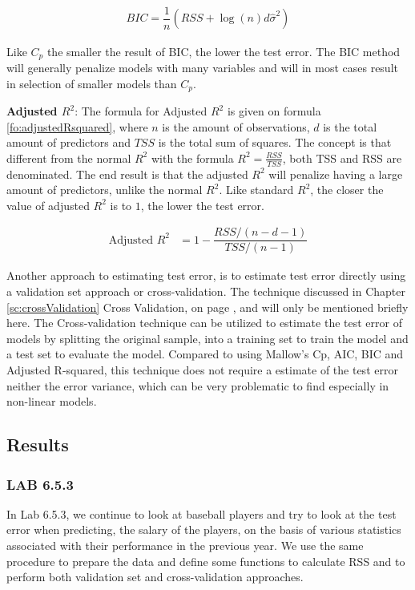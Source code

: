 \begin{align}\label{fo:BIC}
BIC = \dfrac{1}{n} (RSS + \log(n) d \hat{\sigma}^2)
\end{align}

Like $C_p$ the smaller the result of BIC, the lower the test error. The BIC method will generally penalize models with many variables and will in most cases result in selection of smaller models than $C_p$.

\textbf{Adjusted $R^2$}: The formula for Adjusted $R^2$ is given on formula \ref{fo:adjustedRsquared}, where $n$ is the amount of observations, $d$ is the total amount of predictors and $TSS$ is the total sum of squares. The concept is that different from the normal $R^2$ with the formula $R^2 = \tfrac{RSS}{TSS}$, both TSS and RSS  are denominated. The end result is that the adjusted $R^2$ will penalize having a large amount of predictors, unlike the normal $R^2$. Like standard $R^2$, the closer the value of adjusted $R^2$ is to $1$, the lower the test error.

\begin{align}\label{fo:adjustedRsquared}
	\text{Adjusted } R^2 &= 1 - \dfrac{RSS/(n-d-1)}{TSS/(n-1)}
\end{align}

Another approach to estimating test error, is to estimate test error directly using a validation set approach or cross-validation. The technique discussed in Chapter \ref{sc:crossValidation} Cross Validation, on page \pageref{sc:crossValidation}, and will only be mentioned briefly here. The Cross-validation technique can be utilized to estimate the test error of models by splitting the original sample, into a training set to train the model and a test set to evaluate the model. Compared to using Mallow's Cp, AIC, BIC and Adjusted R-squared, this technique does not require a estimate of the test error neither the error variance, which can be very problematic to find especially in non-linear models.

\subsection{Results}
\subsubsection*{LAB 6.5.3}%
In Lab 6.5.3, we continue to look at baseball players and try to look at the test error when predicting, the salary of the players, on the basis of various statistics associated with their performance in the previous year. We use the same procedure to prepare the data and define some functions to calculate RSS and to perform both validation set and cross-validation approaches.

